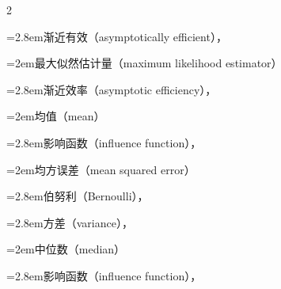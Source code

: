 \begin{multicols}{2}
\par\noindent\hangindent=2.8em\hspace*{1.8em}\label{idx:794}渐近有效（asymptotically efficient），\hyperref[exercise:10.29]{\pageref*{exercise:10.29}}\par
{}
\par\noindent\hangindent=2em\hspace*{1em}\label{idx:795}最大似然估计量（maximum likelihood estimator）\par
\par\noindent\hangindent=2.8em\hspace*{1.8em}\label{idx:796}渐近效率（asymptotic efficiency），\hyperref[thm:10.1.12]{\pageref*{thm:10.1.12}}\par
{}
\par\noindent\hangindent=2em\hspace*{1em}\label{idx:797}均值（mean）\par
\par\noindent\hangindent=2.8em\hspace*{1.8em}\label{idx:798}影响函数（influence function），\hyperref[ex:10.6.2]{\pageref*{ex:10.6.2}}\par
{}
\par\noindent\hangindent=2em\hspace*{1em}\label{idx:799}均方误差（mean squared error）\par
\par\noindent\hangindent=2.8em\hspace*{1.8em}\label{idx:800}伯努利（Bernoulli），\hyperref[ex:7.3.5]{\pageref*{ex:7.3.5}}\par
\par\noindent\hangindent=2.8em\hspace*{1.8em}\label{idx:801}方差（variance），\hyperref[eq:7.3.1]{\pageref*{eq:7.3.1}}\par
{}
\par\noindent\hangindent=2em\hspace*{1em}\label{idx:802}中位数（median）\par
\par\noindent\hangindent=2.8em\hspace*{1.8em}\label{idx:803}影响函数（influence function），\hyperref[idxocc:803:450]{\pageref*{idxocc:803:450}}\par

\end{multicols}
